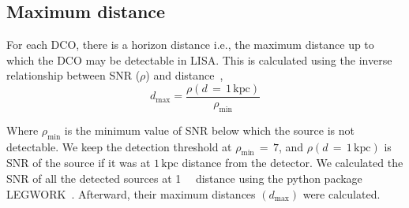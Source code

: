 \documentclass[journal, twocolumns]{IEEEtran}
\newcommand{\kpc}{\kilo\parsec}
\begin{document}

%

    \subsection{Maximum distance}\label{subsec:maximum-distance}
    For each DCO, there is a horizon distance i.e., the maximum distance up to which the DCO may be detectable in LISA. 
    This is calculated using the inverse relationship between SNR ($\rho$) and distance~\cite{Lau2020},
    \begin{equation}
        \label{eq:eq1}
        d_\text{max}=\frac{\rho(d\,=\,1\,\text{kpc})}{\rho_\text{min}}
    \end{equation}

    Where $\rho_{\min}$ is the minimum value of SNR below which the source is not detectable.
	We keep the detection threshold at $\rho_{\min}\,=\,7$, and $\rho(d\,=\,1\,\text{kpc})$ is SNR of the source if it was at $1\,\text{kpc}$ distance from the detector.
	We calculated the SNR of all the detected sources at \SI{1}{\kpc} distance using the python package LEGWORK~\cite{wagg2021legwork}.
	Afterward, their maximum distances $(d_{\max})$ were calculated.
	
\end{document}
